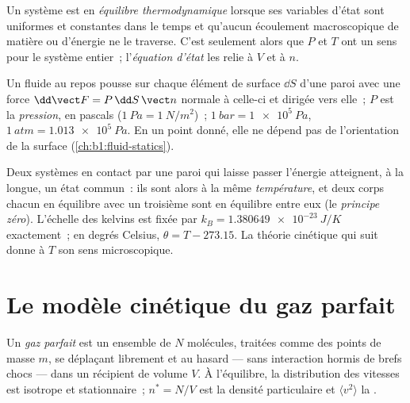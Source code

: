 \begin{definition}\label{def:b1:kinetic-theory:equilibrium}
Un système est en \emph{équilibre thermodynamique} lorsque ses variables
d'état sont uniformes et constantes dans le temps et qu'aucun écoulement
macroscopique de matière ou d'énergie ne le traverse. C'est seulement
alors que $P$ et $T$ ont un sens pour le système entier~; l'\emph{équation
d'état} les relie à $V$ et à $n$.
\end{definition}

\begin{definition}[Pression]\label{def:b1:kinetic-theory:pressure}
Un fluide au repos pousse sur chaque élément de surface $\dd S$ d'une
paroi avec une force $\dd\vect F = P\,\dd S\,\vect n$ normale à celle-ci
et dirigée vers elle~; $P$ est la \emph{pression}, en pascals
($\qty{1}{Pa} = \qty{1}{N/m^2}$)~; $\qty{1}{bar}
= \qty{1e5}{Pa}$, $\qty{1}{atm} = \qty{1.013e5}{Pa}$. En un point donné,
elle ne dépend pas de l'orientation de la surface (\cref{ch:b1:fluid-statics}).
\end{definition}

\begin{definition}[Température]\label{def:b1:kinetic-theory:temperature}
Deux systèmes en contact par une paroi qui laisse passer l'énergie
atteignent, à la longue, un état commun~: ils sont alors à la même
\emph{température}, et deux corps chacun en équilibre avec un troisième
sont en équilibre entre eux (le \emph{principe zéro}). L'échelle des
kelvins est fixée par $k_B = \qty{1.380649e-23}{J/K}$ exactement~; en
degrés Celsius, $\theta = T - 273.15$. La théorie cinétique qui suit
donne à $T$ son sens microscopique.
\end{definition}

\section{Le modèle cinétique du gaz parfait}

\begin{definition}\label{def:b1:kinetic-theory:model}
Un \emph{gaz parfait} est un ensemble de $N$ molécules, traitées comme
des points de masse $m$, se déplaçant librement et au hasard --- sans
interaction hormis de brefs chocs --- dans un récipient de volume $V$. À
l'équilibre, la distribution des vitesses est isotrope et stationnaire~;
$n^* = N/V$ est la densité particulaire et $\langle v^2\rangle$ la
.
\end{definition}

